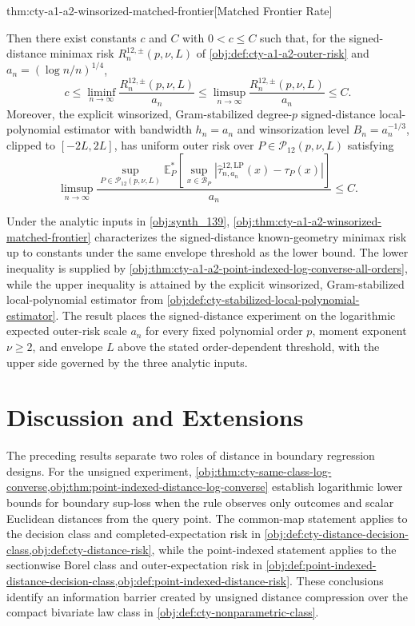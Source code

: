 \documentclass[11pt]{article}
\begin{document}
\begin{theoremv}{thm:cty-a1-a2-winsorized-matched-frontier}[Matched Frontier Rate]
\begin{itemize}
\end{itemize}
Then there exist constants \(c\) and \(C\) with \(0<c\leq C\) such that, for the signed-distance minimax risk \(R^{12,\pm}_n(p,\nu,L)\) of \cref{obj:def:cty-a1-a2-outer-risk} and \(a_n=(\log n/n)^{1/4}\),
\[
c
\leq
\liminf_{n\to\infty}\frac{R^{12,\pm}_n(p,\nu,L)}{a_n}
\leq
\limsup_{n\to\infty}\frac{R^{12,\pm}_n(p,\nu,L)}{a_n}
\leq C .
\]
Moreover, the explicit winsorized, Gram-stabilized degree-\(p\) signed-distance local-polynomial estimator with bandwidth \(h_n=a_n\) and winsorization level \(B_n=a_n^{-1/3}\), clipped to \([-2L,2L]\), has uniform outer risk over \(P\in\mathcal P_{12}(p,\nu,L)\) satisfying
\[
\limsup_{n\to\infty}
\frac{
\sup_{P\in\mathcal P_{12}(p,\nu,L)}
\mathbb E_P^*\!\left[
\sup_{x\in\mathcal B_P}
\left|\widehat\tau^{12,\mathrm{LP}}_{n,a_n}(x)-\tau_P(x)\right|
\right]
}{a_n}
\leq C .
\]
\end{theoremv}

Under the analytic inputs in \cref{obj:synth_139}, \cref{obj:thm:cty-a1-a2-winsorized-matched-frontier} characterizes the signed-distance known-geometry minimax risk up to constants under the same envelope threshold as the lower bound. The lower inequality is supplied by \cref{obj:thm:cty-a1-a2-point-indexed-log-converse-all-orders}, while the upper inequality is attained by the explicit winsorized, Gram-stabilized local-polynomial estimator from \cref{obj:def:cty-stabilized-local-polynomial-estimator}. The result places the signed-distance experiment on the logarithmic expected outer-risk scale \(a_n\) for every fixed polynomial order \(p\), moment exponent \(\nu\ge2\), and envelope \(L\) above the stated order-dependent threshold, with the upper side governed by the three analytic inputs.


\section{Discussion and Extensions}
\label{sec:discussion}

The preceding results separate two roles of distance in boundary regression designs. For the unsigned experiment, \cref{obj:thm:cty-same-class-log-converse,obj:thm:point-indexed-distance-log-converse} establish logarithmic lower bounds for boundary sup-loss when the rule observes only outcomes and scalar Euclidean distances from the query point. The common-map statement applies to the decision class and completed-expectation risk in \cref{obj:def:cty-distance-decision-class,obj:def:cty-distance-risk}, while the point-indexed statement applies to the sectionwise Borel class and outer-expectation risk in \cref{obj:def:point-indexed-distance-decision-class,obj:def:point-indexed-distance-risk}. These conclusions identify an information barrier created by unsigned distance compression over the compact bivariate law class in \cref{obj:def:cty-nonparametric-class}.
\end{document}
